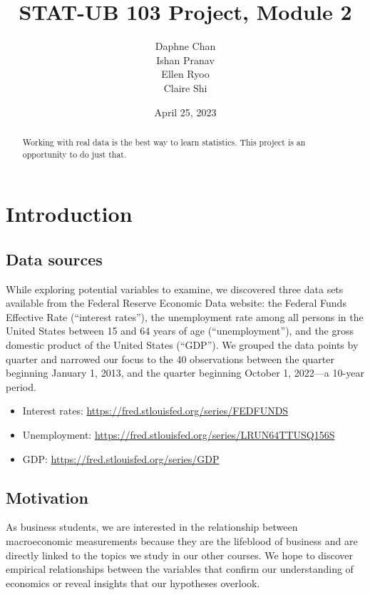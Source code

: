 \documentclass[12pt]{article}
\begin{document}
\def\spacingset#1{\renewcommand{\baselinestretch}
{#1}\small\normalsize} \spacingset{1}
\title{\bf STAT-UB 103 Project, Module 2}
\author{Daphne Chan\\
Ishan Pranav\\
Ellen Ryoo\\
Claire Shi}
\date{April 25, 2023}
\maketitle
\bigskip
\begin{abstract}
Working with real data is the best way to learn statistics. This project is an opportunity to do just that.
\end{abstract}
\newpage
\spacingset{1.08}
\section{Introduction}
\subsection{Data sources}
While exploring potential variables to examine, we discovered three data sets available from the Federal Reserve Economic Data website: the Federal Funds Effective Rate (``interest rates''), the unemployment rate among all persons in the United States between 15 and 64 years of age (``unemployment''), and the gross domestic product of the United States (``GDP''). We grouped the data points by quarter and narrowed our focus to the 40 observations between the quarter beginning January 1, 2013, and the quarter beginning October 1, 2022---a 10-year period. 
\begin{itemize}
\item Interest rates: \url{https://fred.stlouisfed.org/series/FEDFUNDS}
\item Unemployment: \url{https://fred.stlouisfed.org/series/LRUN64TTUSQ156S}
\item GDP: \url{https://fred.stlouisfed.org/series/GDP}
\end{itemize}
\subsection{Motivation}
As business students, we are interested in the relationship between macroeconomic measurements because they are the lifeblood of business and are directly linked to the topics we study in our other courses. We hope to discover empirical relationships between the variables that confirm our understanding of economics or reveal insights that our hypotheses overlook. 
\end{document}
